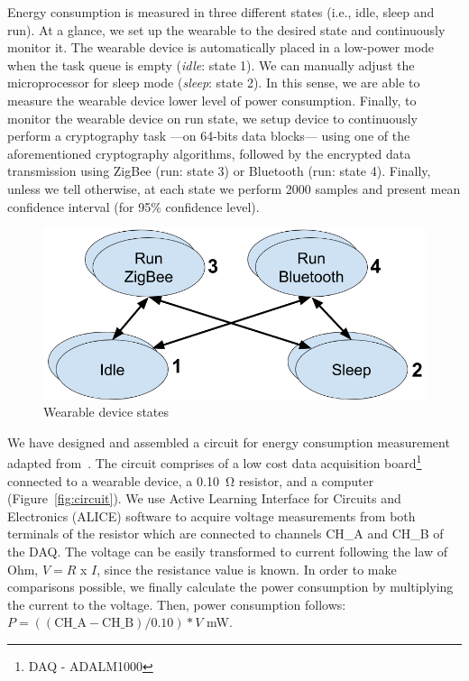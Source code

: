 Energy consumption is measured in three different states (i.e., idle, sleep and run). At a glance, we set up the wearable to the desired state and continuously monitor it. The wearable device is automatically placed in a low-power mode when the task queue is empty (\textit{idle}: state 1). We can manually adjust the microprocessor for sleep mode (\textit{sleep}: state 2). In this sense, we are able to measure the wearable device lower level of power consumption. Finally, to monitor the wearable device on run state, we setup device to continuously perform a cryptography task ---on 64-bits data blocks--- using one of the aforementioned cryptography algorithms, followed by the encrypted data transmission using ZigBee (run: state 3) or Bluetooth (run: state 4).
Finally, unless we tell otherwise, at each state we perform 2000 samples and present mean confidence interval (for 95\% confidence level).


\begin{figure}[tbh]
  \centering
  \includegraphics[scale=0.19]{Figures/estados.png}
  \caption{Wearable device states}
  \label{fig:states}
  \vspace{-0.1cm}
\end{figure}

We have designed and assembled a circuit for energy consumption measurement adapted from~\cite{bessa2017jetsonleap}. The circuit comprises of a low cost data acquisition board\footnote{DAQ - ADALM1000} connected to a wearable device, a 0.10~\si{\ohm} resistor, and a computer (Figure~\ref{fig:circuit}).
We use Active Learning Interface for Circuits and Electronics (ALICE) software to acquire voltage measurements from both terminals of the resistor which are connected to channels CH\_A and CH\_B of the DAQ. The voltage can be easily transformed to current following the law of Ohm, $V = R$ x $I$, since the resistance value is known. In order to make comparisons possible, we finally calculate the power consumption by multiplying the current to the voltage. Then, power consumption follows: 
$P = ((\mbox{CH\_A} - \mbox{CH\_B}) / 0.10) * V $ mW.



